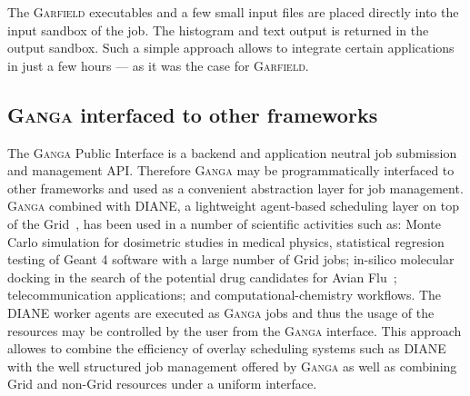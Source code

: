 \documentclass{elsart}
\def\ganga {\textsc{Ganga}\xspace}
\def\garfield {\textsc{Garfield}\xspace}
\def\diane {\textsc{DIANE}\xspace}
\def\grid {Grid\xspace}
\begin{document}
The \garfield executables and a few small input files are placed directly into
the input sandbox of the job. The histogram and text output is returned in the
output sandbox. Such a simple approach allows to integrate certain
applications in just a few hours --- as it was the case for \garfield.

\subsection{\ganga interfaced to other frameworks}
\label{sec:GangaInOtherFrameworks}
The \ganga Public Interface is a backend and application neutral job
submission and management API. Therefore \ganga may be programmatically
interfaced to other frameworks and used as a convenient abstraction layer for
job management. \ganga combined with \diane, a lightweight agent-based
scheduling layer on top of the \grid~\cite{DIANE}, has been used in a number
of scientific activities such as: Monte Carlo simulation for dosimetric
studies in medical physics, statistical regresion testing of Geant 4 software
with a large number of \grid jobs; in-silico molecular docking in the search
of the potential drug candidates for Avian Flu~\cite{AvianFlu};
telecommunication applications; and computational-chemistry workflows. The
\diane worker agents are executed as \ganga jobs and thus the usage of the
resources may be controlled by the user from the \ganga interface. This
approach allowes to combine the efficiency of overlay scheduling systems such
as \diane with the well structured job management offered by \ganga as well as
combining \grid and non-\grid resources under a uniform interface.
\end{document}
